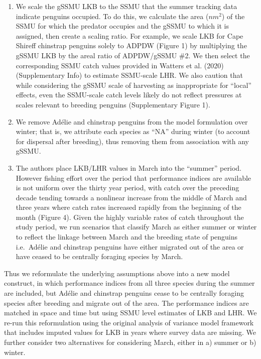 \documentclass[]{elsarticle} %
\providecommand{\tightlist}{%
  \setlength{\itemsep}{0pt}\setlength{\parskip}{0pt}}
\begin{document}
\begin{enumerate}
\def\labelenumi{\arabic{enumi}.}
\tightlist
\item
  We scale the gSSMU LKB to the SSMU that the summer tracking data
  indicate penguins occupied. To do this, we calculate the area
  (\(nm^2\)) of the SSMU for which the predator occupies and the gSSMU
  to which it is assigned, then create a scaling ratio. For example, we
  scale LKB for Cape Shireff chinstrap penguins solely to ADPDW (Figure
  1) by multiplying the gSSMU LKB by the areal ratio of ADPDW/gSSMU \#2.
  We then select the corresponding SSMU catch values provided in Watters
  et al. (2020) (Supplementary Info) to estimate SSMU-scale LHR. We also
  caution that while considering the gSSMU scale of harvesting as
  inappropriate for ``local'' effects, even the SSMU-scale catch levels
  likely do not reflect pressures at scales relevant to breeding
  penguins (Supplementary Figure 1).\\
\item
  We remove Adélie and chinstrap penguins from the model formulation
  over winter; that is, we attribute each species as ``NA'' during
  winter (to account for dispersal after breeding), thus removing them
  from association with any gSSMU.\\
\item
  The authors place LKB/LHR values in March into the ``summer'' period.
  However fishing effort over the period that performance indices are
  available is not uniform over the thirty year period, with catch over
  the preceding decade tending towards a nonlinear increase from the
  middle of March and three years where catch rates increased rapidly
  from the beginning of the month (Figure 4). Given the highly variable
  rates of catch throughout the study period, we run scenarios that
  classify March as either summer or winter to reflect the linkage
  between March and the breeding state of penguins i.e.~Adélie and
  chinstrap penguins have either migrated out of the area or have ceased
  to be centrally foraging species by March.
\end{enumerate}

Thus we reformulate the underlying assumptions above into a new model
construct, in which performance indices from all three species during
the summer are included, but Adélie and chinstrap penguins cease to be
centrally foraging species after breeding and migrate out of the area.
The performance indices are matched in space and time but using SSMU
level estimates of LKB and LHR. We re-run this reformulation using the
original analysis of variance model framework that includes imputed
values for LKB in years where survey data are missing. We further
consider two alternatives for considering March, either in a) summer or
b) winter.
\end{document}
